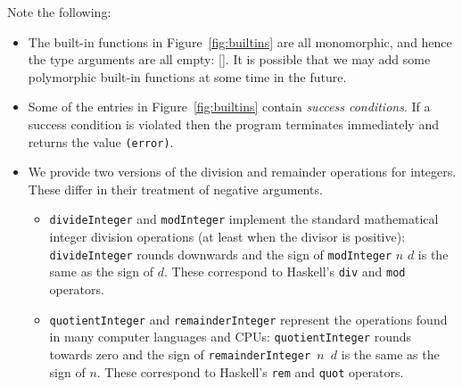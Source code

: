 \documentclass[a4paper]{article}
\begin{document}
Note the following:
\begin{itemize}
\item The built-in functions in Figure~\ref{fig:builtins}
are all monomorphic, and hence the type arguments are all empty: [].
It is possible that we may add some polymorphic built-in functions
at some time in the future.
\item Some of the entries in Figure~\ref{fig:builtins}
  contain \textit{success conditions}.  If a success condition is
  violated then the program terminates immediately and returns
  the value \texttt{(error)}.
\item We provide two versions of the division and remainder operations
  for integers.  These differ in their treatment of negative
  arguments.

  \begin{itemize}

  \item \texttt{divideInteger} and \texttt{modInteger} implement the
    standard mathematical integer division operations (at least when
    the divisor is positive): \texttt{divideInteger} rounds
    downwards and the sign of \texttt{modInteger} $n$ $d$ is the same
    as the sign of $d$.  These correspond to Haskell's \texttt{div}
    and \texttt{mod} operators.

  \item \texttt{quotientInteger} and \texttt{remainderInteger}
    represent the operations found in many computer languages and
    CPUs: \texttt{quotientInteger} rounds towards zero and the sign
    of \texttt{remainderInteger $n$ $d$} is the same as the sign of
    $n$.  These correspond to Haskell's \texttt{rem} and \texttt{quot}
    operators.  \end{itemize}


%
%


\end{itemize}
\end{document}
